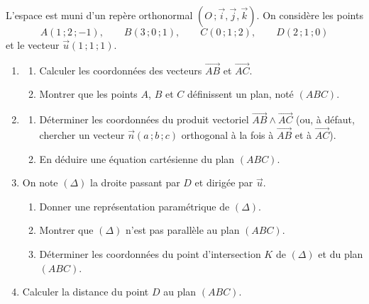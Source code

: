 \documentclass[11pt]{article}
\begin{document}
\begin{exercice}
L'espace est muni d'un repère orthonormal $(O\,;\vec{i},\vec{j},\vec{k})$. On considère les points
\[ A(1\,;2\,;-1), \qquad B(3\,;0\,;1), \qquad C(0\,;1\,;2), \qquad D(2\,;1\,;0) \]
et le vecteur $\vec{u}(1\,;1\,;1)$.
\begin{enumerate}
\item \begin{enumerate}
\item Calculer les coordonnées des vecteurs $\overrightarrow{AB}$ et $\overrightarrow{AC}$.
\item Montrer que les points $A$, $B$ et $C$ définissent un plan, noté $(ABC)$.
\end{enumerate}
\item \begin{enumerate}
\item Déterminer les coordonnées du produit vectoriel $\overrightarrow{AB} \wedge \overrightarrow{AC}$ (ou, à défaut, chercher un vecteur $\vec{n}(a\,;b\,;c)$ orthogonal à la fois à $\overrightarrow{AB}$ et à $\overrightarrow{AC}$).
\item En déduire une équation cartésienne du plan $(ABC)$.
\end{enumerate}
\item On note $(\Delta)$ la droite passant par $D$ et dirigée par $\vec{u}$.
\begin{enumerate}
\item Donner une représentation paramétrique de $(\Delta)$.
\item Montrer que $(\Delta)$ n'est pas parallèle au plan $(ABC)$.
\item Déterminer les coordonnées du point d'intersection $K$ de $(\Delta)$ et du plan $(ABC)$.
\end{enumerate}
\item Calculer la distance du point $D$ au plan $(ABC)$.
\end{enumerate}
\end{exercice}
\end{document}
